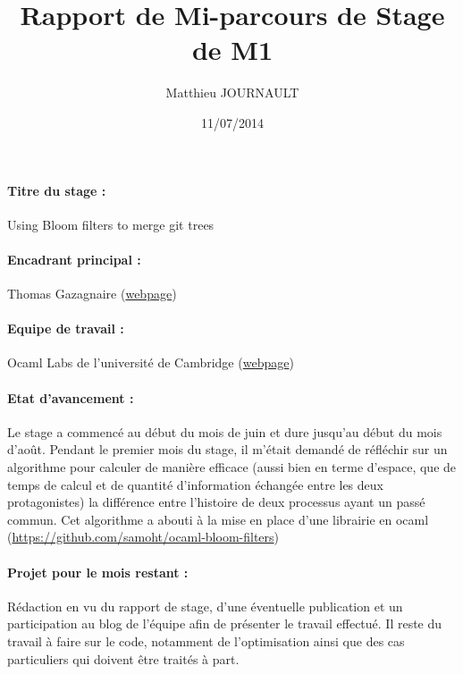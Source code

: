 \documentclass[a4paper,10pt]{article}
\title{Rapport de Mi-parcours de Stage de M1}
\author{Matthieu JOURNAULT}
\date{11/07/2014}
\theoremstyle{definition}
\theoremstyle{definition}
\begin{document}
\maketitle
\paragraph{Titre du stage :} Using Bloom filters to merge git trees
\paragraph{Encadrant principal :} Thomas Gazagnaire (\href{http://thomas.gazagnaire.org/}{webpage})
\paragraph{Equipe de travail :} Ocaml Labs de l'université de Cambridge (\href{http://www.cl.cam.ac.uk/projects/ocamllabs/}{webpage})
\paragraph{Etat d'avancement :} Le stage a commencé au début du mois de juin et dure jusqu'au début du mois d'août. Pendant le premier mois du stage, il m'était demandé de réfléchir sur un algorithme pour calculer de manière efficace (aussi bien en terme d'espace, que de temps de calcul et de quantité d'information échangée entre les deux protagonistes) la différence entre l'histoire de deux processus ayant un passé commun. Cet algorithme a abouti à la mise en place d'une librairie en ocaml (\url{https://github.com/samoht/ocaml-bloom-filters})
\paragraph{Projet pour le mois restant :} Rédaction en vu du rapport de stage, d'une éventuelle publication et un participation au blog de l'équipe afin de présenter le travail effectué. Il reste du travail à faire sur le code, notamment de l'optimisation ainsi que des cas particuliers qui doivent être traités à part.
\end{document}
